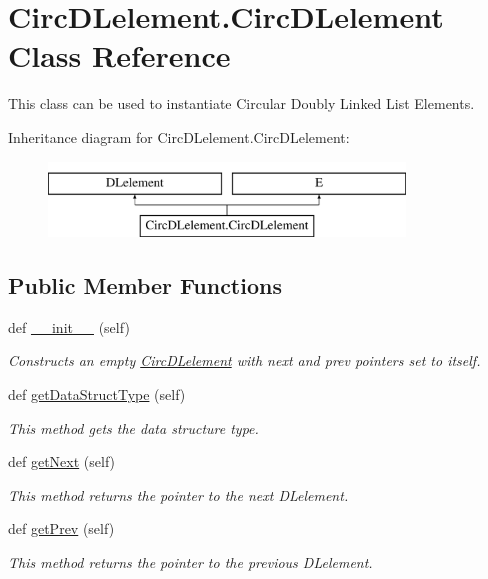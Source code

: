 \hypertarget{class_circ_d_lelement_1_1_circ_d_lelement}{}\section{Circ\+D\+Lelement.\+Circ\+D\+Lelement Class Reference}
\label{class_circ_d_lelement_1_1_circ_d_lelement}


This class can be used to instantiate Circular Doubly Linked List Elements.  


Inheritance diagram for Circ\+D\+Lelement.\+Circ\+D\+Lelement\+:\begin{figure}[H]
\begin{center}
\leavevmode
\includegraphics[height=2.000000cm]{class_circ_d_lelement_1_1_circ_d_lelement}
\end{center}
\end{figure}
\subsection*{Public Member Functions}
\begin{DoxyCompactItemize}
\item 
def \hyperlink{class_circ_d_lelement_1_1_circ_d_lelement_a02986166d6a1a8ab414cbac1e90c26e4}{\+\_\+\+\_\+init\+\_\+\+\_\+} (self)
\begin{DoxyCompactList}\small\item\em Constructs an empty \hyperlink{class_circ_d_lelement_1_1_circ_d_lelement}{Circ\+D\+Lelement} with next and prev pointers set to itself. \end{DoxyCompactList}\item 
def \hyperlink{class_circ_d_lelement_1_1_circ_d_lelement_aa15b8fd836d6fb25b69f4be07b0e8247}{get\+Data\+Struct\+Type} (self)
\begin{DoxyCompactList}\small\item\em This method gets the data structure type. \end{DoxyCompactList}\item 
def \hyperlink{class_circ_d_lelement_1_1_circ_d_lelement_a17f5b17575fc29e7671fc7d543460cc9}{get\+Next} (self)
\begin{DoxyCompactList}\small\item\em This method returns the pointer to the next D\+Lelement. \end{DoxyCompactList}\item 
def \hyperlink{class_circ_d_lelement_1_1_circ_d_lelement_a834d1744b8e043bee01898cadb33ec7f}{get\+Prev} (self)
\begin{DoxyCompactList}\small\item\em This method returns the pointer to the previous D\+Lelement. \end{DoxyCompactList}\end{DoxyCompactItemize}
